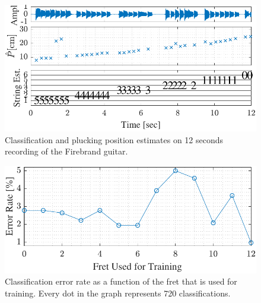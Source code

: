 \documentclass{article}
\begin{document}
%
\begin{figure}[t]
  \centering
  \centerline{\includegraphics[width=.92\columnwidth]{img/tablature_constant_note23_LSD}}\vspace{-2mm}
  \caption{Classification and plucking position estimates on 12 seconds recording of the Firebrand guitar.}\label{fig:pluck_position_varied_tabs}\vspace{-.6mm}
\end{figure} \vspace{-.8mm}
%
\vspace{-.6mm}
\begin{figure}[htbp]
  \centering \vspace{-6mm}
  \centerline{\includegraphics[width=.95\columnwidth]{img/errorRate_vs_frets}}\vspace{-2mm}
  \caption{Classification error rate as a function of the fret that is used for training. Every  dot in the graph represents 720 classifications.}\label{fig:err_vs_frets}
\end{figure}%
%
%
%
%
\end{document}
